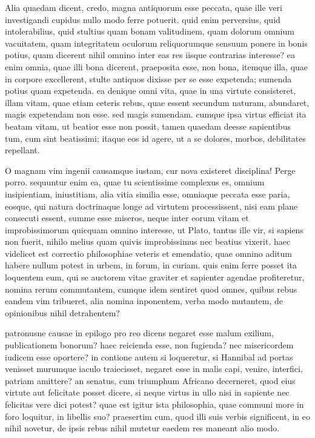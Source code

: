  Alia quaedam dicent, credo, magna antiquorum esse peccata, quae ille veri investigandi cupidus nullo modo ferre potuerit. quid enim perversius, quid intolerabilius, quid stultius quam bonam valitudinem, quam dolorum omnium vacuitatem, quam integritatem oculorum reliquorumque sensuum ponere in bonis potius, quam dicerent nihil omnino inter eas res iisque contrarias interesse? ea enim omnia, quae illi bona dicerent, praeposita esse, non bona, itemque illa, quae in corpore excellerent, stulte antiquos dixisse per se esse expetenda; sumenda potius quam expetenda. ea denique omni vita, quae in una virtute consisteret, illam vitam, quae etiam ceteris rebus, quae essent secundum naturam, abundaret, magis expetendam non esse. sed magis sumendam. cumque ipsa virtus efficiat ita beatam vitam, ut beatior esse non possit, tamen quaedam deesse sapientibus tum, cum sint beatissimi; itaque eos id agere, ut a se dolores, morbos, debilitates repellant.

 O magnam vim ingenii causamque iustam, cur nova existeret disciplina! Perge porro. sequuntur enim ea, quae tu scientissime complexus es, omnium insipientiam, iniustitiam, alia vitia similia esse, omniaque peccata esse paria, eosque, qui natura doctrinaque longe ad virtutem processissent, nisi eam plane consecuti essent, summe esse miseros, neque inter eorum vitam et improbissimorum quicquam omnino interesse, ut Plato, tantus ille vir, si sapiens non fuerit, nihilo melius quam quivis improbissimus nec beatius vixerit. haec videlicet est correctio philosophiae veteris et emendatio, quae omnino aditum habere nullum potest in urbem, in forum, in curiam. quis enim ferre posset ita loquentem eum, qui se auctorem vitae graviter et sapienter agendae profiteretur, nomina rerum commutantem, cumque idem sentiret quod omnes, quibus rebus eandem vim tribueret, alia nomina inponentem, verba modo mutantem, de opinionibus nihil detrahentem?

 patronusne causae in epilogo pro reo dicens negaret esse malum exilium, publicationem bonorum? haec reicienda esse, non fugienda? nec misericordem iudicem esse oportere? in contione autem si loqueretur, si Hannibal ad portas venisset murumque iaculo traiecisset, negaret esse in malis capi, venire, interfici, patriam amittere? an senatus, cum triumphum Africano decerneret, quod eius virtute aut felicitate posset dicere, si neque virtus in ullo nisi in sapiente nec felicitas vere dici potest? quae est igitur ista philosophia, quae communi more in foro loquitur, in libellis suo? praesertim cum, quod illi suis verbis significent, in eo nihil novetur, de ipsis rebus nihil mutetur eaedem res maneant alio modo.

